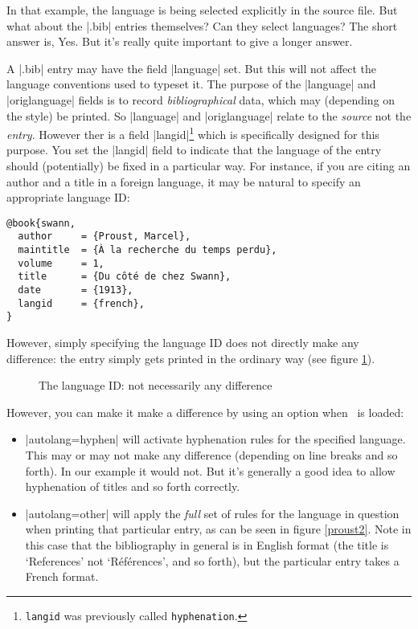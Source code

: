 In that example, the language is being selected explicitly in the
source file. But what about the |.bib| entries themselves? Can they
select languages? The short answer is, Yes. But it's really quite
important to give a longer answer.

A |.bib| entry may have the field |language| set. But this will not
affect the language conventions used to typeset it. The purpose of the
|language| and |origlanguage| fields is to record
\emph{bibliographical} data, which may (depending on the style) be
printed. So |language| and
|origlanguage| relate to the \emph{source} not the
\emph{entry}. However ther is a field
|langid|\footnote{\texttt{langid} was previously called
  \texttt{hyphenation}.} which is specifically designed for this
purpose. You set the |langid| field to indicate that the language of
the entry should (potentially) be fixed in a particular way. For
instance, if you are citing an author and a title in a foreign
language, it may be natural to specify an appropriate language ID:

\begin{verbatim}
@book{swann,
  author     = {Proust, Marcel},
  maintitle  = {À la recherche du temps perdu},
  volume     = 1,
  title      = {Du côté de chez Swann},
  date       = {1913},
  langid     = {french},
}
\end{verbatim}

However, simply specifying the language ID does not directly make any
difference: the entry simply gets printed in the ordinary way (see
figure \ref{proust1}).
\begin{figure}
\caption{The language ID: not necessarily any difference\label{proust1}}
\end{figure}

However, you can make it make a difference by using an option when
\biblatex\ is loaded:
\begin{itemize}
\item |autolang=hyphen| will activate hyphenation rules for the
  specified language. This may or may not make any difference
  (depending on line breaks and so forth). In our example it would
  not. But it's generally a good idea to allow hyphenation of titles
  and so forth correctly.
\item |autolang=other| will apply the \emph{full} set of rules for the
  language in question when printing that particular entry, as can be
  seen in figure \ref{proust2}. Note in this case that the
  bibliography in general is in English format (the title is
  `References' not `Références', and so forth), but the particular
  entry takes a French format.
\end{itemize}

